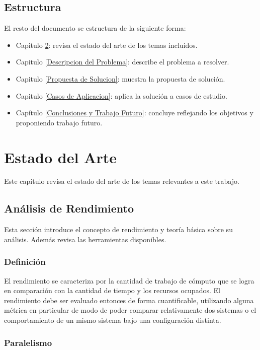 \documentclass[a4paper]{report}
\begin{document}
\section{Estructura}

El resto del documento se estructura de la siguiente forma:

\begin{itemize}
\item Capitulo \ref{Estado del Arte}: revisa el estado del arte de los temas incluidos.
\item Capitulo \ref{Descripcion del Problema}: describe el problema a resolver.
\item Capitulo \ref{Propuesta de Solucion}: muestra la propuesta de solución.
\item Capitulo \ref{Casos de Aplicacion}: aplica la solución a casos de estudio.
\item Capítulo \ref{Conclusiones y Trabajo Futuro}: concluye reflejando los objetivos y proponiendo trabajo futuro.
\end{itemize}

\chapter{Estado del Arte} \label{Estado del Arte}

Este capítulo revisa el estado del arte de los temas relevantes a este trabajo.

\section{Análisis de Rendimiento}\label{chapter:analysis}

Esta sección introduce el concepto de rendimiento y teoría básica sobre su análisis.
Además revisa las herramientas disponibles.

\subsection{Definición}

El rendimiento se caracteriza por la cantidad de trabajo de cómputo que se
logra en comparación con la cantidad de tiempo y los recursos ocupados.
El rendimiento debe ser evaluado entonces de forma cuantificable, utilizando alguna
métrica en particular de modo de poder comparar relativamente dos sistemas o
el comportamiento de un mismo sistema bajo una configuración distinta.

\subsection{Paralelismo}
\end{document}
